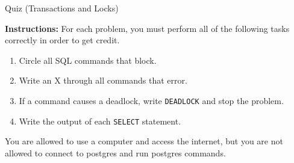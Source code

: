 \documentclass[10pt]{article}
\theoremstyle{definition}
\newcounter{ProblemCounter}
\newcommand{\nextproblem}{\filbreak\stepcounter{ProblemCounter} \noindent\textbf{Problem \theProblemCounter}:}
\begin{document}
\begin{center}
{
\Large
    Quiz (Transactions and Locks)
}

    \vspace{0.1in}
\end{center}

\noindent
\textbf{Instructions:}
For each problem, you must perform all of the following tasks correctly in order to get credit.
\begin{enumerate}
\item Circle all SQL commands that block.
\item Write an X through all commands that error.
\item If a command causes a deadlock, write \lstinline{DEADLOCK} and stop the problem.
\item Write the output of each \lstinline{SELECT} statement.
\end{enumerate}
    You are allowed to use a computer and access the internet, but you are not allowed to connect to postgres and run postgres commands.

\vspace{1in}

%
%
%
%
%
%
%
%
%
%
%
%
%
%
%
\end{document}
